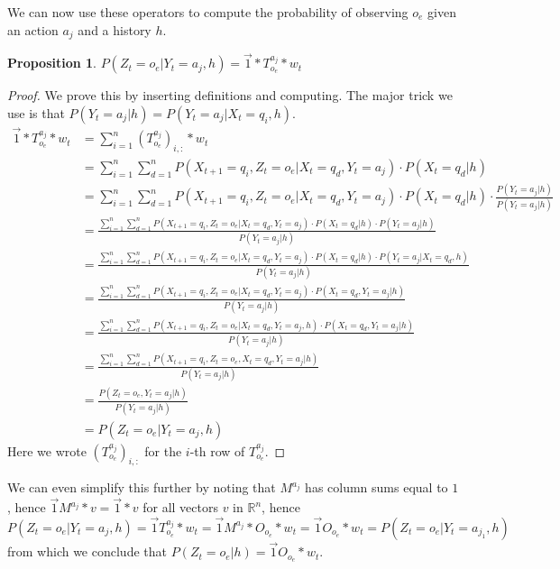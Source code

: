 \documentclass{article}
\newtheorem{prop}{Proposition}
\theoremstyle{definition}
\begin{document}
We can now use these operators to compute the probability of observing $o_e$ given an action $a_j$ and a history $h$. 
\begin{prop}
$P(Z_t=o_e|Y_t=a_j,h)=\vec{1}*T^{a_j}_{o_e}*w_t$ 
\end{prop}
\begin{proof}
We prove this by inserting definitions and computing. The major trick we use is that $P(Y_t=a_j|h)=P(Y_t=a_j|X_t=q_i,h)$.
\begin{align*}
\vec{1}*T^{a_j}_{o_e}*w_t&=\sum\limits_{i=1}^{n} (T^{a_j}_{o_e})_{i,:}*w_t \\
&=\sum\limits_{i=1}^{n} \sum\limits_{d=1}^{n} P(X_{t+1}=q_i,Z_t=o_e|X_t=q_d,Y_t=a_j)\cdot P(X_t=q_d|h) \\
&=\sum\limits_{i=1}^{n} \sum\limits_{d=1}^{n} P(X_{t+1}=q_i,Z_t=o_e|X_t=q_d,Y_t=a_j)\cdot P(X_t=q_d|h)\cdot \frac{P(Y_t=a_j|h)}{P(Y_t=a_j|h)} \\
&=\frac{\sum\limits_{i=1}^{n} \sum\limits_{d=1}^{n} P(X_{t+1}=q_i,Z_t=o_e|X_t=q_d,Y_t=a_j)\cdot P(X_t=q_d|h)\cdot P(Y_t=a_j|h)}{P(Y_t=a_j|h)} \\
&=\frac{\sum\limits_{i=1}^{n} \sum\limits_{d=1}^{n} P(X_{t+1}=q_i,Z_t=o_e|X_t=q_d,Y_t=a_j)\cdot P(X_t=q_d|h)\cdot P(Y_t=a_j|X_t=q_d,h)}{P(Y_t=a_j|h)} \\
&=\frac{\sum\limits_{i=1}^{n} \sum\limits_{d=1}^{n} P(X_{t+1}=q_i,Z_t=o_e|X_t=q_d,Y_t=a_j)\cdot P(X_t=q_d,Y_t=a_j|h)}{P(Y_t=a_j|h)} \\
&=\frac{\sum\limits_{i=1}^{n} \sum\limits_{d=1}^{n} P(X_{t+1}=q_i,Z_t=o_e|X_t=q_d,Y_t=a_j,h)\cdot P(X_t=q_d,Y_t=a_j|h)}{P(Y_t=a_j|h)} \\
&=\frac{\sum\limits_{i=1}^{n} \sum\limits_{d=1}^{n} P(X_{t+1}=q_i,Z_t=o_e,X_t=q_d,Y_t=a_j|h)}{P(Y_t=a_j|h)} \\
&=\frac{ P(Z_t=o_e,Y_t=a_j|h)}{P(Y_t=a_j|h)} \\
&=P(Z_t=o_e|Y_t=a_j,h)
\end{align*}
Here we wrote $(T^{a_j}_{o_e})_{i,:}$ for the $i$-th row of $T^{a_j}_{o_e}$. 
\end{proof}
We can even simplify this further by noting that $M^{a_j}$ has column sums equal to $1$, hence $\vec{1}M^{a_j}*v=\vec{1}*v$ for all vectors $v$ in $\mathbb{R}^n$, hence 
\[
P(Z_t=o_e|Y_t=a_j,h)=\vec{1}T^{a_j}_{o_e}*w_t=\vec{1}M^{a_j}*O_{o_e}*w_t=\vec{1}O_{o_e}*w_t=P(Z_t=o_e|Y_t=a_{j_1},h)
\]
from which we conclude that $P(Z_t=o_e|h)=\vec{1}O_{o_e}*w_t$. 
\end{document}

